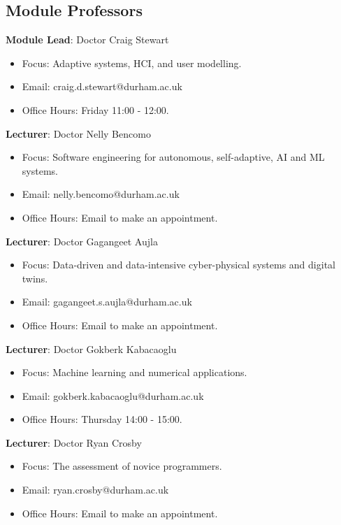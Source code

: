 \subsection{Module Professors}

\textbf{Module Lead}: Doctor Craig Stewart

\begin{itemize}\label{modulelead-craigstewart}
    \item Focus: Adaptive systems, HCI, and user modelling. 
    \item Email: craig.d.stewart@durham.ac.uk
    \item Office Hours: Friday 11:00 - 12:00.
\end{itemize}

\textbf{Lecturer}: Doctor Nelly Bencomo

\begin{itemize}\label{lecturer-nellybencomo}
    \item Focus: Software engineering for autonomous, self-adaptive, AI and ML systems.
    \item Email: nelly.bencomo@durham.ac.uk
    \item Office Hours: Email to make an appointment.
\end{itemize}

\textbf{Lecturer}: Doctor Gagangeet Aujla

\begin{itemize}\label{lecturer-gagangeetaujla}
    \item Focus: Data-driven and data-intensive cyber-physical systems and digital twins.
    \item Email: gagangeet.s.aujla@durham.ac.uk
    \item Office Hours: Email to make an appointment.
\end{itemize}

\textbf{Lecturer}: Doctor Gokberk Kabacaoglu 

\begin{itemize}\label{lecturer-gokberkkabacaoglu}
    \item Focus: Machine learning and numerical applications.
    \item Email: gokberk.kabacaoglu@durham.ac.uk
    \item Office Hours: Thursday 14:00 - 15:00.
\end{itemize}

\textbf{Lecturer}: Doctor Ryan Crosby

\begin{itemize}\label{lecturer-ryancrosby}
    \item Focus: The assessment of novice programmers.
    \item Email: ryan.crosby@durham.ac.uk
    \item Office Hours: Email to make an appointment.
\end{itemize}

